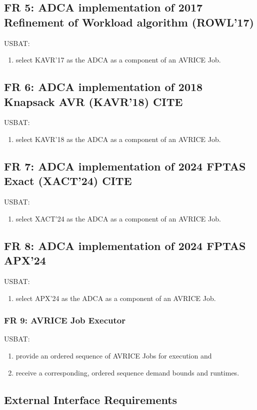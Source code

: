 \documentclass[12pt,a4paper]{article}
\begin{document}
\subsection{FR 5: ADCA implementation of 2017 Refinement of Workload algorithm (ROWL'17)}
USBAT:
\begin{enumerate}
    \item select KAVR'17 as the ADCA as a component of an AVRICE Job.
\end{enumerate}
\subsection{FR 6: ADCA implementation of 2018 Knapsack AVR (KAVR'18) CITE}
USBAT:
\begin{enumerate}
    \item select KAVR'18 as the ADCA as a component of an AVRICE Job.
\end{enumerate}
\subsection{FR 7: ADCA implementation of 2024 FPTAS Exact (XACT'24) CITE}
USBAT:
\begin{enumerate}
    \item select XACT'24 as the ADCA as a component of an AVRICE Job.
\end{enumerate}
\subsection{FR 8: ADCA implementation of 2024 FPTAS APX'24}
USBAT:
\begin{enumerate}
    \item select APX'24 as the ADCA as a component of an AVRICE Job.
\end{enumerate}

\subsubsection{FR 9: AVRICE Job Executor}
USBAT:
\begin{enumerate}
    \item provide an ordered sequence of AVRICE Jobs for execution and
    \item receive a corresponding, ordered sequence demand bounds and runtimes.
\end{enumerate}


\subsection{External Interface Requirements}
\end{document}
